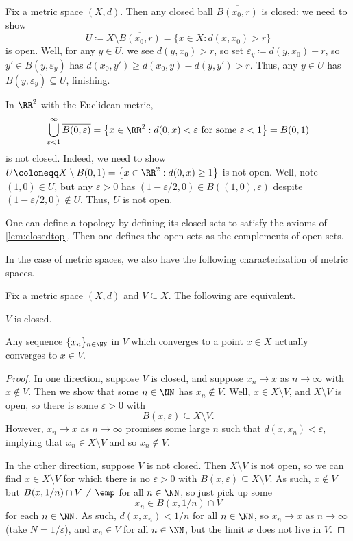 \documentclass[../notes.tex]{subfiles}
\begin{document}
\begin{example}
	Fix a metric space $(X,d)$. Then any closed ball $\overline{B(x_0,r)}$ is closed: we need to show
	\[U\coloneqq X\setminus\overline{B(x_0,r)}=\{x\in X:d(x,x_0)>r\}\]
	is open. Well, for any $y\in U$, we see $d(y,x_0)>r$, so set $\varepsilon_y\coloneqq d(y,x_0)-r$, so $y'\in B(y,\varepsilon_y)$ has $d(x_0,y')\ge d(x_0,y)-d(y,y')>r$. Thus, any $y\in U$ has $B(y,\varepsilon_y)\subseteq U$, finishing.
\end{example}
\begin{remark}
	In $\RR^2$ with the Euclidean metric,
	\[\bigcup_{\varepsilon<1}^\infty\overline{B(0,\varepsilon)}=\left\{x\in\RR^2:d(0,x)<\varepsilon\text{ for some }\varepsilon<1\right\}=B(0,1)\]
	is not closed. Indeed, we need to show $U\coloneqq X\setminus B(0,1)=\left\{x\in\RR^2:d(0,x)\ge1\right\}$ is not open. Well, note $(1,0)\in U$, but any $\varepsilon>0$ has $(1-\varepsilon/2,0)\in B((1,0),\varepsilon)$ despite $(1-\varepsilon/2,0)\notin U$. Thus, $U$ is not open.
\end{remark}
\begin{remark}
	One can define a topology by defining its closed sets to satisfy the axioms of \autoref{lem:closedtop}. Then one defines the open sets as the complements of open sets.
\end{remark}
In the case of metric spaces, we also have the following characterization of metric spaces.
\begin{lemma} \label{lem:metricclosed}
	Fix a metric space $(X,d)$ and $V\subseteq X$. The following are equivalent.
	\begin{listalph}
		\item $V$ is closed.
		\item Any sequence $\{x_n\}_{n\in\NN}$ in $V$ which converges to a point $x\in X$ actually converges to $x\in V$.
	\end{listalph}
\end{lemma}
\begin{proof}
	In one direction, suppose $V$ is closed, and suppose $x_n\to x$ as $n\to\infty$ with $x\notin V$. Then we show that some $n\in\NN$ has $x_n\notin V$. Well, $x\in X\setminus V$, and $X\setminus V$ is open, so there is some $\varepsilon>0$ with
	\[B(x,\varepsilon)\subseteq X\setminus V.\]
	However, $x_n\to x$ as $n\to\infty$ promises some large $n$ such that $d(x,x_n)<\varepsilon$, implying that $x_n\in X\setminus V$ and so $x_n\notin V$.

	In the other direction, suppose $V$ is not closed. Then $X\setminus V$ is not open, so we can find $x\in X\setminus V$ for which there is no $\varepsilon>0$ with $B(x,\varepsilon)\subseteq X\setminus V$. As such, $x\notin V$ but $B(x,1/n)\cap V\ne\emp$ for all $n\in\NN$, so just pick up some
	\[x_n\in B(x,1/n)\cap V\]
	for each $n\in\NN$. As such, $d(x,x_n)<1/n$ for all $n\in\NN$, so $x_n\to x$ as $n\to\infty$ (take $N=1/\varepsilon$), and $x_n\in V$ for all $n\in\NN$, but the limit $x$ does not live in $V$.
\end{proof}
\end{document}
